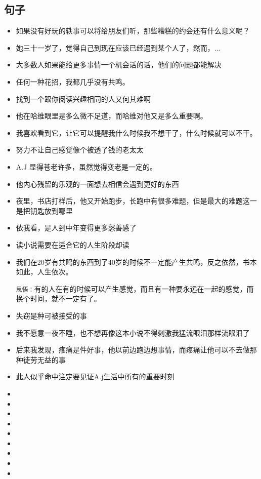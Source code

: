 \documentclass[UTF8,a4paper,8pt]{ctexart}
\begin{document}
		\subsection{句子}
			\begin{itemize}
				\item 如果没有好玩的轶事可以将给朋友们听，那些糟糕的约会还有什么意义呢？ 
				\item 她三十一岁了，觉得自己到现在应该已经遇到某个人了，然而，...
				\item 大多数人如果能给更多事情一个机会话的话，他们的问题都能解决
				\item 任何一种花招，我都几乎没有共鸣。
				\item 找到一个跟你阅读兴趣相同的人又何其难啊
				\item 他在哈维眼里是多么微不足道，而哈维对他又是多么重要啊。
				\item 我喜欢看到它，让它可以提醒我什么时候我不想干了，什么时候就可以不干。
				\item 努力不让自己感觉像个被透了钱的老太太
				\item A.J 显得苍老许多，虽然觉得变老是一定的。
				\item 他内心残留的乐观的一面想去相信会遇到更好的东西
				\item 夜里，书店打样后，他又开始跑步，长跑中有很多难题，但是最大的难题这一是把钥匙放到哪里 
				\item 依我看，是人到中年变得更多愁善感了  
				\item 读小说需要在适合它的人生阶段却读
				\item 我们在20岁有共鸣的东西到了40岁的时候不一定能产生共鸣，反之依然，书本如此，人生依次。
				
				\verb|思悟：|有的人在有的时候可以产生感觉，而且有一种要永远在一起的感觉，而换个时间，就不一定有了。
				
				\item 失窃是种可被接受的事
				\item 我不愿意一夜不睡，也不想再像这本小说不得刺激我猛流眼泪那样流眼泪了
				\item 后来我发现，疼痛是件好事，他以前边跑边想事情，而疼痛让他可以不去做那种徒劳无益的事
				\item 此人似乎命中注定要见证A.j生活中所有的重要时刻
				\item 
				\item 
				\item 
				\item 
				\item 
				\item 
				\item 
				\item 
				\item 
			\end{itemize}
	
\end{document}

